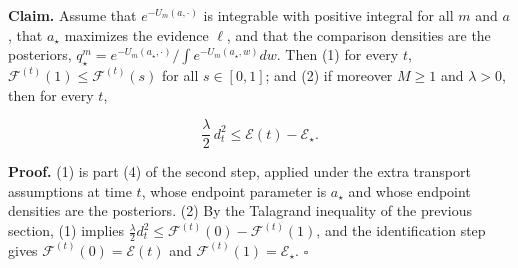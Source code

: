 \documentclass[11pt,a4paper]{report}
\begin{document}
\textbf{Claim.} Assume that \(e^{-U_m(a,\cdot)}\) is integrable with positive integral for all \(m\) and \(a\), that \(a_\star\) maximizes the evidence \(\ell\), and that the comparison densities are the posteriors, \(q_\star^m=e^{-U_m(a_\star,\cdot)}/\int e^{-U_m(a_\star,w)}dw\). Then (1) for every \(t\), \(\mathcal F^{(t)}(1)\le\mathcal F^{(t)}(s)\) for all \(s\in[0,1]\); and (2) if moreover \(M\ge1\) and \(\lambda>0\), then for every \(t\),


\[\frac\lambda2\,d_t^2\le\mathcal E(t)-\mathcal E_\star.\]


\textbf{Proof.} (1) is part (4) of the second step, applied under the extra transport assumptions at time \(t\), whose endpoint parameter is \(a_\star\) and whose endpoint densities are the posteriors. (2) By the Talagrand inequality of the previous section, (1) implies \(\frac\lambda2d_t^2\le\mathcal F^{(t)}(0)-\mathcal F^{(t)}(1)\), and the identification step gives \(\mathcal F^{(t)}(0)=\mathcal E(t)\) and \(\mathcal F^{(t)}(1)=\mathcal E_\star\). \(\square\)
\end{document}

